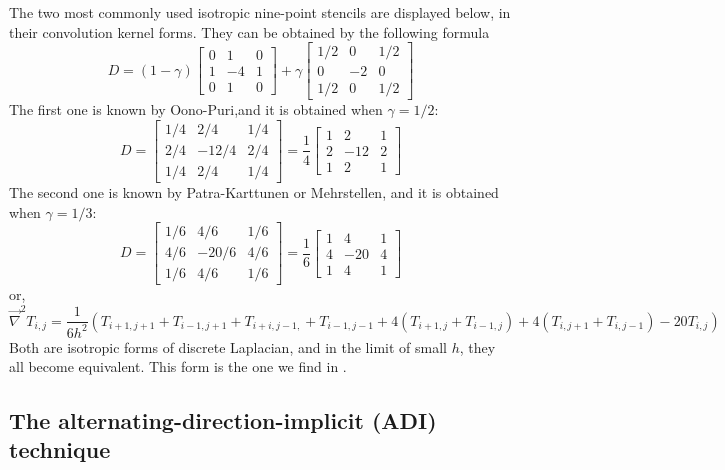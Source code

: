 The two most commonly used isotropic nine-point stencils are displayed below, in their convolution kernel forms. They can be obtained by the following formula
\[
D = (1-\gamma) 
\left[
\begin{array}{ccc}
0 &1 &0 \\
1 &-4 &1 \\
0 &1 &0
\end{array}
\right]
+\gamma
\left[
\begin{array}{ccc}
1/2 &0 & 1/2 \\
0 & -2 & 0 \\
1/2 &0 & 1/2 
\end{array}
\right]
\]
The first one is known by Oono-Puri,and it is obtained when $\gamma=1/2$:
\[
D=
\left[
\begin{array}{ccc}
1/4 & 2/4 & 1/4 \\
2/4 &-12/4 & 2/4 \\
1/4 & 2/4 & 1/4 
\end{array}
\right]
=
\frac14
\left[
\begin{array}{ccc}
1 & 2 & 1 \\
2 &-12 & 2 \\
1 & 2 & 1 
\end{array}
\right]
\]
The second one is known by Patra-Karttunen or Mehrstellen, and it is obtained when $\gamma=1/3$:
\[
D=
\left[
\begin{array}{ccc}
1/6 & 4/6 & 1/6 \\
4/6 & -20/6 & 4/6 \\
1/6 & 4/6 & 1/6 
\end{array}
\right]
=
\frac16
\left[
\begin{array}{ccc}
1 & 4 & 1 \\
4 & -20 & 4 \\
1 & 4 & 1 
\end{array}
\right]
\]
or,
\[
\vec\nabla^2 T_{i,j} = \frac{1}{6h^2} (T_{i+1,j+1} + T_{i-1,j+1} + T_{i+i,j-1,} + T_{i-1,j-1}
+4 (T_{i+1,j}+T_{i-1,j})
+4 (T_{i,j+1}+T_{i,j-1})
-20 T_{i,j} )
\]
Both are isotropic forms of discrete Laplacian, and in the limit of small $h$, they all become equivalent. This form is the one we find in \textcite[p64]{leveque}.

\subsection{The alternating-direction-implicit (ADI) technique}


